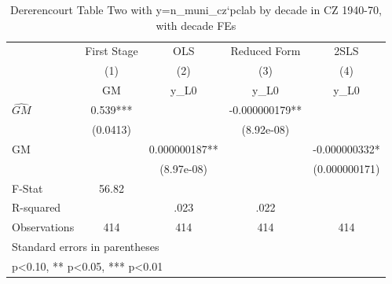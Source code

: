 \begin{table}[htbp]\centering
\def\sym#1{\ifmmode^{#1}\else\(^{#1}\)\fi}
\caption{Dererencourt Table Two with y=n\_muni\_cz`pclab by decade in CZ 1940-70, with decade FEs}
\begin{tabular}{l*{4}{c}}
\toprule
                    & First Stage   &         OLS   &Reduced Form   &        2SLS   \\
                    &\multicolumn{1}{c}{(1)}&\multicolumn{1}{c}{(2)}&\multicolumn{1}{c}{(3)}&\multicolumn{1}{c}{(4)}\\
                    &\multicolumn{1}{c}{GM}&\multicolumn{1}{c}{y\_L0}&\multicolumn{1}{c}{y\_L0}&\multicolumn{1}{c}{y\_L0}\\
\midrule
$\hat{GM}$          &       0.539***&               &-0.000000179** &               \\
                    &    (0.0413)   &               &  (8.92e-08)   &               \\
\addlinespace
GM                  &               & 0.000000187** &               &-0.000000332*  \\
                    &               &  (8.97e-08)   &               &(0.000000171)   \\
\midrule
F-Stat              &       56.82   &               &               &               \\
R-squared           &               &        .023   &        .022   &               \\
Observations        &         414   &         414   &         414   &         414   \\
\bottomrule
\multicolumn{5}{l}{\footnotesize Standard errors in parentheses}\\
\multicolumn{5}{l}{\footnotesize * p<0.10, ** p<0.05, *** p<0.01}\\
\end{tabular}
\end{table}
